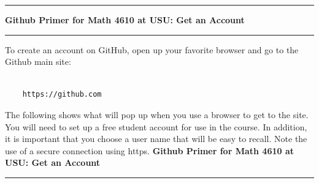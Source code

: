 \documentclass[10pt,fleqn]{article}
\begin{document}
\vskip0.1in\hrule\vskip0.1in
\noindent
{\bf Github Primer for Math 4610 at USU: Get an Account} 
\vskip0.1in\hrule\vskip0.1in
\noindent
To create an account on GitHub, open up your favorite browser and go to the
Github main site:
\begin{verbatim}

    https://github.com

\end{verbatim}
The following shows what will pop up when you use a browser to get to the site.
You will need to set up a free student account for use in the course. In
addition, it is important that you choose a user name that will be easy to
recall. Note the use of a secure connection using https.
{\bf{\large
  Github Primer for Math 4610 at USU: Get an Account 
}}
\vskip0.1in\hrule\vskip0.1in
\end{document}
